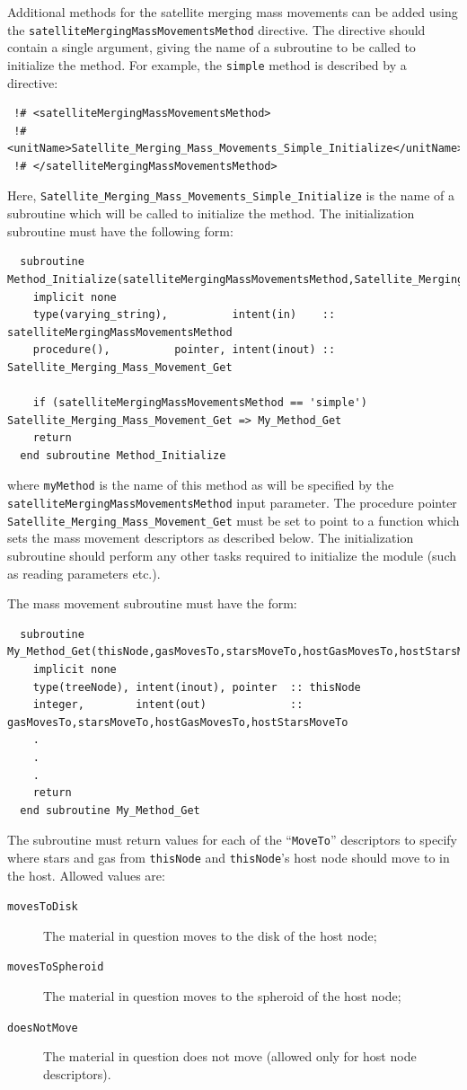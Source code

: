 Additional methods for the satellite merging mass movements can be added using the {\tt satelliteMergingMassMovementsMethod} directive. The directive should contain a single argument, giving the name of a subroutine to be called to initialize the method. For example, the {\tt simple} method is described by a directive:
\begin{verbatim}
 !# <satelliteMergingMassMovementsMethod>
 !#  <unitName>Satellite_Merging_Mass_Movements_Simple_Initialize</unitName>
 !# </satelliteMergingMassMovementsMethod>
\end{verbatim}
Here, {\tt Satellite\_Merging\_Mass\_Movements\_Simple\_Initialize} is the name of a subroutine which will be called to initialize the method. The initialization subroutine must have the following form:
\begin{verbatim}
  subroutine Method_Initialize(satelliteMergingMassMovementsMethod,Satellite_Merging_Mass_Movement_Get)
    implicit none
    type(varying_string),          intent(in)    :: satelliteMergingMassMovementsMethod
    procedure(),          pointer, intent(inout) :: Satellite_Merging_Mass_Movement_Get
    
    if (satelliteMergingMassMovementsMethod == 'simple') Satellite_Merging_Mass_Movement_Get => My_Method_Get
    return
  end subroutine Method_Initialize
\end{verbatim}
where {\tt myMethod} is the name of this method as will be specified by the {\tt satelliteMergingMassMovementsMethod} input parameter. The procedure pointer {\tt Satellite\_Merging\_Mass\_Movement\_Get} must be set to point to a function which sets the mass movement descriptors as described below. The initialization subroutine should perform any other tasks required to initialize the module (such as reading parameters etc.).

The mass movement subroutine must have the form:
\begin{verbatim}
  subroutine My_Method_Get(thisNode,gasMovesTo,starsMoveTo,hostGasMovesTo,hostStarsMoveTo)
    implicit none
    type(treeNode), intent(inout), pointer  :: thisNode
    integer,        intent(out)             :: gasMovesTo,starsMoveTo,hostGasMovesTo,hostStarsMoveTo
    .
    .
    .
    return
  end subroutine My_Method_Get
\end{verbatim}
The subroutine must return values for each of the ``{\tt MoveTo}'' descriptors to specify where stars and gas from {\tt thisNode} and {\tt thisNode}'s host node should move to in the host. Allowed values are:
\begin{description}
 \item [{\tt movesToDisk}] The material in question moves to the disk of the host node;
 \item [{\tt movesToSpheroid}] The material in question moves to the spheroid of the host node;
 \item [{\tt doesNotMove}] The material in question does not move (allowed only for host node descriptors).
\end{description}

